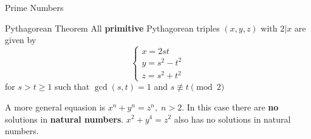 \documentclass[12pt, letterpaper]{article}
\begin{document}
\begin{section}{Prime Numbers}
\begin{subsection}{Pythagorean Theorem}
    All \textbf{primitive} Pythagorean triples \((x, y, z)\) with \(2 | x\) are given by
    \[\begin{cases}
        x = 2st \\
        y = s^{2} - t^{2} \\
        z = s^{2} + t^{2}
      \end{cases}
    \]
    for \(s > t \geq 1\) such that \(\gcd(s, t) = 1\) and \(s \not\equiv t \pmod{2}\)

    A more general equasion is \(x^{n} + y^{n} = z^{n}, \; n > 2\). In this case
    there are \textbf{no} solutions in \textbf{natural numbers}.
    \(x^{2} + y^{4} = z^{2}\) also has no solutions in natural numbers.

  \end{subsection}

\end{section}
\end{document}
